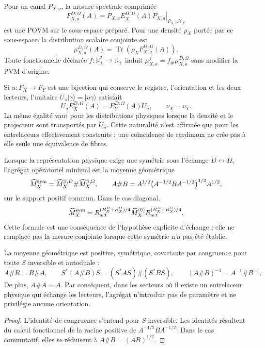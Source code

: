Pour un canal \(P_{X,a}\), la mesure spectrale comprimée
\[
 F_{X,a}^{D,\Omega}(A)
 =\left.P_{X,a}E_X^{D,\Omega}(A)P_{X,a}\right|_{P_{X,a}\mathcal H_X}
\]
est une POVM sur le sous-espace préparé. Pour une densité \(\rho_X\)
portée par ce sous-espace, la distribution scalaire conjointe est
\[
 \mu_{X,a}^{D,\Omega}(A)
 =\operatorname{Tr}\!\left(
 \rho_X F_{X,a}^{D,\Omega}(A)
 \right).
\]
Toute fonctionnelle déclarée \(f:\mathbb R_+^2\to\mathbb R_+\) induit
\(\mu_{X,a}^f=f_\#\mu_{X,a}^{D,\Omega}\) sans modifier la PVM d'origine.

Si \(u:F_X\to F_Y\) est une bijection qui conserve le registre, l'orientation et
les deux lecteurs, l'unitaire \(U_u|\gamma\rangle=|u\gamma\rangle\) satisfait
\[
 U_uE_X^{D,\Omega}(A)=E_Y^{D,\Omega}(A)U_u,
 \qquad
 \nu_X=\nu_Y.
\]
La même égalité vaut pour les distributions physiques lorsque la densité et le
projecteur sont transportés par \(U_u\). Cette naturalité n'est affirmée que pour
les entrelaceurs effectivement construits ; une coïncidence de
cardinaux ne crée pas à elle seule une équivalence de fibres.

Lorsque la représentation physique exige une symétrie sous l'échange
\(D\leftrightarrow\Omega\), l'agrégat opératoriel minimal est la moyenne
géométrique
\[
 \widehat M_X^{\rm sym}
 =\widehat M_X^{\beta,D}\#\widehat M_X^{\beta,\Omega},
 \qquad
 A\#B
 =A^{1/2}\bigl(A^{-1/2}BA^{-1/2}\bigr)^{1/2}A^{1/2},
\]
sur le support positif commun. Dans le cas diagonal,
\[
 \widehat M_X^{\rm sym}
 =R_{\rm act}^{(B_X^D+B_X^\Omega)/4}
  \widehat M_X^{(0)}
  R_{\rm act}^{(B_X^D+B_X^\Omega)/4}.
\]
Cette formule est une conséquence de l'hypothèse explicite d'échange ; elle ne
remplace pas la mesure conjointe lorsque cette symétrie n'a pas été établie.

\begin{theorem}
La moyenne géométrique est positive, symétrique, covariante par congruence pour
toute \(S\) inversible et autoduale :
\[
 A\#B=B\#A,
 \qquad
 S^*(A\#B)S=(S^*AS)\#(S^*BS),
 \qquad
 (A\#B)^{-1}=A^{-1}\#B^{-1}.
\]
De plus, \(A\#A=A\). Par conséquent, dans les secteurs où il existe un
entrelaceur physique qui échange les lecteurs, l'agrégat n'introduit pas de
paramètre et ne privilégie aucune orientation.
\end{theorem}

\begin{proof}
L'identité de congruence s'entend pour \(S\) inversible. Les identités
résultent du calcul fonctionnel de la racine positive de
\(A^{-1/2}BA^{-1/2}\). Dans le cas commutatif, elles se réduisent à
\(A\#B=(AB)^{1/2}\).
\end{proof}


